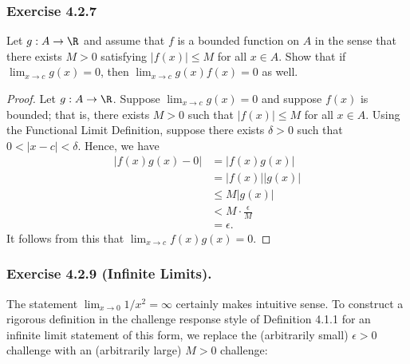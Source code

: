 \subsubsection{Exercise 4.2.7} Let \( g: A \to \R  \) and assume that \( f \) is a bounded function on \( A \) in the sense that there exists \( M > 0  \) satisfying \( | f(x) | \leq  M  \) for all \( x \in A  \). Show that if \( \lim_{ x \to c } g(x) = 0  \), then \( \lim_{ x \to c } g(x)f(x) = 0  \) as well.
\begin{proof}
Let \( g: A \to \R  \). Suppose \( \lim_{ x \to c } g(x) = 0   \) and suppose \( f(x) \) is bounded; that is, there exists \( M > 0  \) such that \( | f(x) | \leq M  \) for all \( x \in A  \). Using the Functional Limit Definition, suppose there exists \( \delta > 0  \) such that \( 0 < | x - c  | < \delta \). Hence, we have 
\begin{align*}
    | f(x)g(x) - 0  | &= | f(x) g(x) |  \\
                      &= | f(x) | | g(x) | \\
                      &\leq M | g(x) | \\
                      &< M \cdot \frac{ \epsilon  }{ M } \\
                      &= \epsilon.
\end{align*}
It follows from this that \( \lim_{ x \to c } f(x)g(x) = 0  \).
\end{proof}

\subsubsection{Exercise 4.2.9 (Infinite Limits).} The statement \( \lim_{ x \to 0 } 1/x^2 = \infty  \) certainly makes intuitive sense. To construct a rigorous definition in the challenge response style of Definition 4.1.1 for an infinite limit statement of this form, we replace the (arbitrarily small) \( \epsilon > 0  \) challenge with an (arbitrarily large) \( M > 0  \) challenge: 

